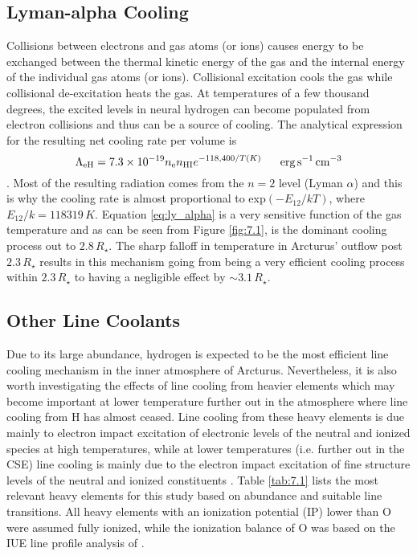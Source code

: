 \subsection{Lyman-alpha Cooling}\label{sec:7.3.3}
Collisions between electrons and gas atoms (or ions) causes energy to be exchanged between the thermal kinetic energy of the gas and the internal energy of the individual gas atoms (or ions). Collisional excitation cools the gas while collisional de-excitation heats the gas. At temperatures of a few thousand degrees, the excited levels in neural hydrogen can become populated from electron collisions and thus can be a source of cooling. The analytical expression for the resulting net cooling rate per volume is
\begin{equation}
\label{eq:ly_alpha}
\Lambda _{\rm{eH}} = 7.3\times 10^{-19}n_{\rm{e}}n_{\rm{HI}}e^{-118,400/T(K)} \ \ \ \ \ \rm{erg\,s^{-1}\,cm^{-3}}
\end{equation}
\cite{spitzer_1978}. Most of the resulting radiation comes from the $n=2$ level (Lyman $\alpha$) and this is why the cooling rate is almost proportional to exp$(-E_{12}/kT)$, where $E_{12}/k=118319\,K$. Equation \ref{eq:ly_alpha} is a very sensitive function of the gas temperature and as can be seen from Figure \ref{fig:7.1}, is the dominant cooling process out to $2.8\,R_{\star}$. The sharp falloff in temperature in Arcturus' outflow post $2.3\,R_{\star}$ results in this mechanism going from being a very efficient cooling process within $2.3\,R_{\star}$ to having a negligible effect by $\sim 3.1\,R_{\star}$.

\subsection{Other Line Coolants}\label{sec:7.3.4}
Due to its large abundance, hydrogen is expected to be the most efficient line cooling mechanism in the inner atmosphere of Arcturus. Nevertheless, it is also worth investigating the effects of line cooling from heavier elements which may become important at lower temperature further out in the atmosphere where line cooling from H has almost ceased. Line cooling from these heavy elements is due mainly to electron impact excitation of electronic levels of the neutral and ionized species at high temperatures, while at lower temperatures (i.e. further out in the CSE) line cooling is mainly due to the electron impact excitation of fine structure levels of the neutral and ionized constituents \citep{dalgarno_1972}. Table \ref{tab:7.1} lists the most relevant heavy elements for this study based on abundance and suitable line transitions. All heavy elements with an ionization potential (IP) lower than O were assumed fully ionized,  while the ionization balance of O was based on the IUE line profile analysis of \cite{judge_1986}.

